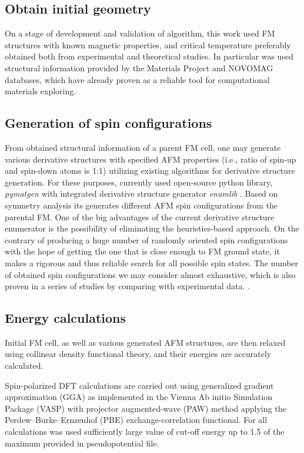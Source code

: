 \subsection{Obtain initial geometry}
On a stage of development and validation of algorithm, this work used FM structures with known magnetic properties, and critical temperature preferably obtained both from experimental and theoretical studies. In particular was used structural information provided by the Materials Project and NOVOMAG databases, which have already proven as a reliable tool for computational materials exploring. 

\subsection{Generation of spin configurations}
From obtained structural information of a parent FM cell, one may generate various derivative structures with specified AFM properties (i.e., ratio of spin-up and spin-down atoms is 1:1) utilizing existing algorithms for derivative structure generation. 
For these purposes, currently used open-source python library, \textit{pymatgen} \cite{Ong:2013vd} with integrated derivative structure generator \textit{enumlib} \cite{enum_1, enum_2, enum_3, enum_4}. Based on symmetry analysis its generates different AFM spin configurations from the parental FM. One of the big advantages of the current derivative structure enumerator is the possibility of eliminating the heuristics-based approach. On the contrary of producing a huge number of randomly oriented spin configurations with the hope of getting the one that is close enough to FM ground state, it makes a rigorous and thus reliable search for all possible spin states. The number of obtained spin configurations we may consider almost exhaustive, which is also proven in a series of studies by comparing with experimental data. \cite{Zhu_2018, Jiang_2018} .

\subsection{Energy calculations}

Initial FM cell, as well as various generated AFM structures, are then relaxed using collinear density functional theory,  and their energies are accurately calculated.  

Spin-polarized DFT calculations are carried out using generalized gradient approximation (GGA) as implemented in the Vienna Ab initio Simulation Package (VASP) \cite{Kresse_1996} with projector augmented-wave (PAW) \cite{Kresse_1999} method applying the Perdew–Burke–Ernzenhof (PBE) \cite{Perdew_1996} exchange-correlation functional. For all calculations was used sufficiently large value of cut-off energy up to 1.5 of the maximum provided in pseudopotential file.

